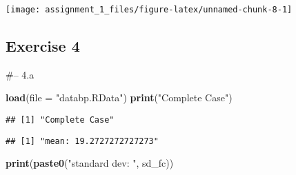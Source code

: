 \documentclass[
]{article}
\newenvironment{Shaded}{\begin{snugshade}}{\end{snugshade}}
\newcommand{\DataTypeTok}[1]{\textcolor[rgb]{0.13,0.29,0.53}{#1}}
\newcommand{\KeywordTok}[1]{\textcolor[rgb]{0.13,0.29,0.53}{\textbf{#1}}}
\newcommand{\NormalTok}[1]{#1}
\newcommand{\OperatorTok}[1]{\textcolor[rgb]{0.81,0.36,0.00}{\textbf{#1}}}
\newcommand{\OtherTok}[1]{\textcolor[rgb]{0.56,0.35,0.01}{#1}}
\newcommand{\StringTok}[1]{\textcolor[rgb]{0.31,0.60,0.02}{#1}}
\begin{document}
\begin{center}\texttt{[image: assignment\_1\_files/figure-latex/unnamed-chunk-8-1]} \end{center}

\hypertarget{exercise-4}{%
\subsection{Exercise 4}\label{exercise-4}}

\#-- 4.a

\begin{Shaded}
\begin{Highlighting}[]
\KeywordTok{load}\NormalTok{(}\DataTypeTok{file =} \StringTok{"databp.RData"}\NormalTok{)}
\KeywordTok{print}\NormalTok{(}\StringTok{"Complete Case"}\NormalTok{)}
\end{Highlighting}
\end{Shaded}

\begin{verbatim}
## [1] "Complete Case"
\end{verbatim}

\begin{Shaded}
\end{Shaded}

\begin{verbatim}
## [1] "mean: 19.2727272727273"
\end{verbatim}

\begin{Shaded}
\begin{Highlighting}[]
\KeywordTok{print}\NormalTok{(}\KeywordTok{paste0}\NormalTok{(}\StringTok{"standard dev: "}\NormalTok{, sd_fc))}
\end{Highlighting}
\end{Shaded}
\end{document}
